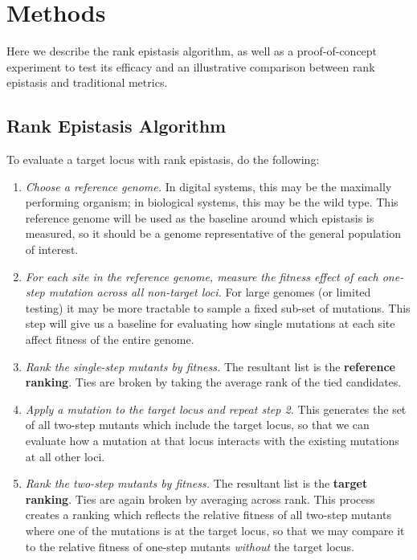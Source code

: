 \section{Methods}

Here we describe the rank epistasis algorithm, as well as a proof-of-concept experiment to test its efficacy and an illustrative comparison between rank epistasis and traditional metrics. 

\subsection{Rank Epistasis Algorithm}
To evaluate a target locus with rank epistasis, do the following: 

\begin{enumerate}

\item \textit{Choose a reference genome.} In digital systems, this may be the maximally performing organism; in biological systems, this may be the wild type. This reference genome will be used as the baseline around which epistasis is measured, so it should be a genome representative of the general population of interest.

\item \textit{For each site in the reference genome, measure the fitness effect of each one-step mutation across all non-target loci.}  For large genomes (or limited testing) it may be more tractable to sample a fixed sub-set of mutations. This step will give us a baseline for evaluating how single mutations at each site affect fitness of the entire genome.

\item \textit{Rank the single-step mutants by fitness.} The resultant list is the \textbf{reference ranking}. Ties are broken by taking the average rank of the tied candidates. 

\item \textit{Apply a mutation to the target locus and repeat step 2.} This generates the set of all two-step mutants which include the target locus, so that we can evaluate how a mutation at that locus interacts with the existing mutations at all other loci.

\item \textit{Rank the two-step mutants by fitness.} The resultant list is the \textbf{target ranking}. Ties are again broken by averaging across rank. This process creates a ranking which reflects the relative fitness of all two-step mutants where one of the mutations is at the target locus, so that we may compare it to the relative fitness of one-step mutants \textit{without} the target locus.


\end{enumerate}
